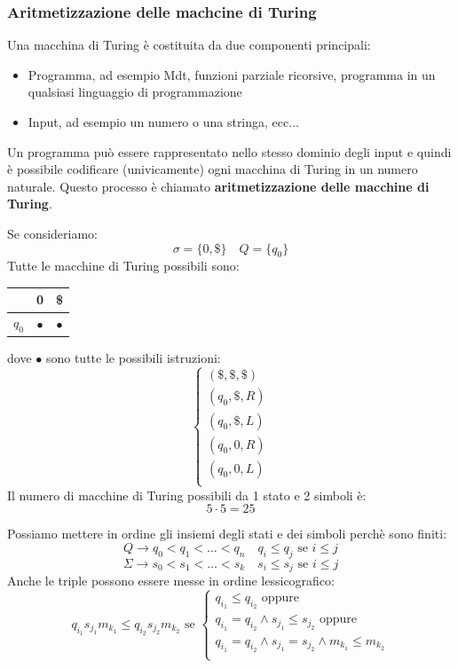 \documentclass[a4paper]{article}
\begin{document}
\subsubsection{Aritmetizzazione delle machcine di Turing}
Una macchina di Turing è costituita da due componenti principali:
\begin{itemize}
  \item Programma, ad esempio Mdt, funzioni parziale ricorsive, programma in un qualsiasi
    linguaggio di programmazione
  \item Input, ad esempio un numero o una stringa, ecc...
\end{itemize}
Un programma può essere rappresentato nello stesso dominio degli input e quindi
è possibile codificare (univicamente) ogni macchina di Turing in un numero naturale.
Questo processo è chiamato \textbf{aritmetizzazione delle macchine di Turing}.
\begin{example}
  Se consideriamo:
  \[
    \sigma = \{0, \$\} \quad Q = \{q_0\} 
  \] 
  Tutte le macchine di Turing possibili sono:
  \begin{table}[H]
    \centering
    \begin{tabular}{|c|c|c|}
      \hline
      & 0 & \$ \\
      \hline
      \( q_0 \) & \( \bullet \)  & \( \bullet \)  \\
      \hline
    \end{tabular}
  \end{table}
  dove \( \bullet \) sono tutte le possibili istruzioni:
  \[
    \begin{cases}
      (\$, \$, \$) \\
      (q_0, \$, R) \\
      (q_0, \$, L) \\
      (q_0, 0, R) \\
      (q_0, 0, L) \\
    \end{cases}
  \] 
  Il numero di macchine di Turing possibili da 1 stato e 2 simboli è:
  \[
    5 \cdot 5 = 25
  \] 
\end{example}
Possiamo mettere in ordine gli insiemi degli stati e dei simboli perchè sono finiti:
\[
  Q \to q_0 < q_1 < \ldots < q_n \quad q_i \le q_j \text{ se } i \le j
\] 
\[
  \Sigma \to s_0 < s_1 < \ldots < s_k \quad s_i \le s_j \text{ se } i \le j
\]
Anche le triple possono essere messe in ordine lessicografico:
\[
  q_{i_1} s_{j_1} m_{k_1} \le q_{i_2} s_{j_2} m_{k_2} \text{ se }
  \begin{cases}
    q_{i_1} \le  q_{i_2} \text{ oppure }\\
    q_{i_1} = q_{i_2} \wedge s_{j_1} \le  s_{j_2} \text{ oppure }\\
    q_{i_1} = q_{i_2} \wedge s_{j_1} = s_{j_2} \wedge m_{k_1} \le  m_{k_2} \\
  \end{cases}
\] 
\end{document}
